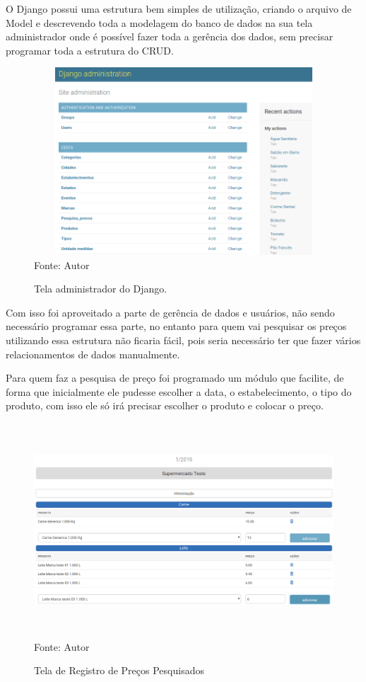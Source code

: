\documentclass{ifto-tex}
\begin{document}
O Django possui uma estrutura bem simples de utilização, criando o arquivo de Model e descrevendo toda a modelagem do banco de dados na sua tela administrador onde é possível fazer toda a gerência dos dados, sem precisar programar toda a estrutura do CRUD.

\begin{figure}[H]
	\begin{center}
		\includegraphics[width=16.0cm, height= 7.0cm]{cestaadmin.png}    %
		Fonte: Autor
		\caption{Tela administrador do Django.} 
		\label{fig:faces}
	\end{center}
\end{figure}
Com isso foi aproveitado a parte de gerência de dados e usuários, não sendo necessário programar essa parte, no entanto para quem vai pesquisar os preços utilizando essa estrutura não ficaria fácil, pois seria necessário ter que fazer vários relacionamentos de dados manualmente.

Para quem faz a pesquisa de preço foi programado um módulo que facilite, de forma que inicialmente ele pudesse escolher a data, o estabelecimento, o tipo do produto, com isso ele só irá precisar escolher o produto e colocar o preço.

\begin{figure}[H]
	\begin{center}
		\includegraphics[width=16.0cm, height= 8.0cm]{cestacadastro.png}    %
		Fonte: Autor
		\caption{Tela de Registro de Preços Pesquisados} 
		\label{fig:faces}
	\end{center}
\end{figure}
\end{document}
